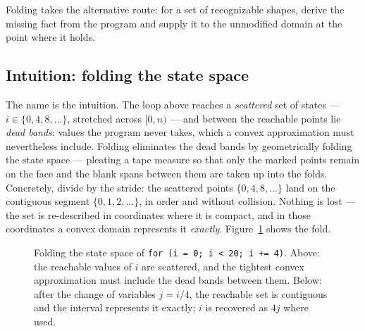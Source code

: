 \documentclass[11pt,a4paper]{article}
\begin{document}
Folding takes the alternative route: for a set of recognizable shapes, derive the missing
fact from the program and supply it to the unmodified domain at the point where it holds.

\subsection{Intuition: folding the state space}
\label{sec:intuition}

The name is the intuition. The loop above reaches a \emph{scattered} set of states ---
$i \in \{0, 4, 8, \dots\}$, stretched across $[0, n)$ --- and between the reachable points
lie \emph{dead bands}: values the program never takes, which a convex approximation must
nevertheless include. Folding eliminates the dead bands by geometrically folding the state
space --- pleating a tape measure so that only the marked points remain on the face and
the blank spans between them are taken up into the folds. Concretely, divide by the
stride: the scattered points $\{0,4,8,\dots\}$ land on the contiguous segment
$\{0,1,2,\dots\}$, in order and without collision. Nothing is lost --- the set is re-described in coordinates where it is
compact, and in those coordinates a convex domain represents it \emph{exactly}.
Figure~\ref{fig:fold} shows the fold.

\begin{figure}[t]
\centering
{}
\caption{Folding the state space of \texttt{for (i = 0; i < 20; i += 4)}. Above: the
reachable values of $i$ are scattered, and the tightest convex approximation must include
the dead bands between them. Below: after the change of variables $j = i/4$, the reachable
set is contiguous and the interval represents it exactly; $i$ is recovered as $4j$ where
used.}
\label{fig:fold}
\end{figure}
\end{document}

